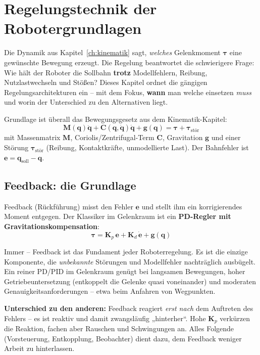 
\chapter{Regelungstechnik der Robotergrundlagen}
\label{ch:regelung}

Die Dynamik aus Kapitel~\ref{ch:kinematik} sagt, \emph{welches} Gelenkmoment
$\bm{\tau}$ eine gewünschte Bewegung erzeugt. Die Regelung beantwortet die
schwierigere Frage: Wie hält der Roboter die Sollbahn \textbf{trotz}
Modellfehlern, Reibung, Nutzlastwechseln und Stößen? Dieses Kapitel ordnet die
gängigen Regelungsarchitekturen ein -- mit dem Fokus, \textbf{wann} man welche
einsetzen \emph{muss} und worin der Unterschied zu den Alternativen liegt.

Grundlage ist überall das Bewegungsgesetz aus dem Kinematik-Kapitel:
\begin{equation}\label{eq:dyn}
\bm{M}(\bm{q})\ddot{\bm{q}} + \bm{C}(\bm{q},\dot{\bm{q}})\dot{\bm{q}}
+ \bm{g}(\bm{q}) = \bm{\tau} + \bm{\tau}_{\text{stör}}
\end{equation}
mit Massenmatrix $\bm{M}$, Coriolis/Zentrifugal-Term $\bm{C}$, Gravitation
$\bm{g}$ und einer Störung $\bm{\tau}_{\text{stör}}$ (Reibung, Kontaktkräfte,
unmodellierte Last). Der Bahnfehler ist $\bm{e} = \bm{q}_{\text{soll}} - \bm{q}$.

\section{Feedback: die Grundlage}
Feedback (Rückführung) misst den Fehler $\bm{e}$ und stellt ihm ein
korrigierendes Moment entgegen. Der Klassiker im Gelenkraum ist ein
\textbf{PD-Regler mit Gravitationskompensation}:
\begin{equation}
\bm{\tau} = \bm{K}_p\,\bm{e} + \bm{K}_d\,\dot{\bm{e}} + \bm{g}(\bm{q})
\end{equation}
\begin{infobox}[title=Wann einsetzen]
Immer -- Feedback ist das Fundament jeder Roboterregelung. Es ist die einzige
Komponente, die \emph{unbekannte} Störungen und Modellfehler nachträglich
ausbügelt. Ein reiner PD/PID im Gelenkraum genügt bei langsamen Bewegungen,
hoher Getriebeuntersetzung (entkoppelt die Gelenke quasi voneinander) und
moderaten Genauigkeitsanforderungen -- etwa beim Anfahren von Wegpunkten.
\end{infobox}
\textbf{Unterschied zu den anderen:} Feedback reagiert \emph{erst nach} dem
Auftreten des Fehlers -- es ist reaktiv und damit zwangsläufig
„hinterher``. Hohe $\bm{K}_p$ verkürzen die Reaktion, fachen aber Rauschen und
Schwingungen an. Alles Folgende (Vorsteuerung, Entkopplung, Beobachter) dient
dazu, dem Feedback weniger Arbeit zu hinterlassen.

